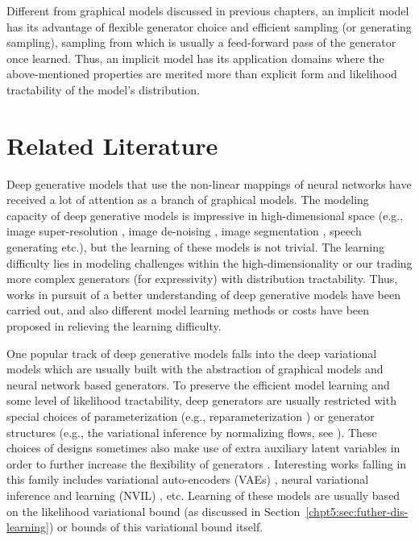 Different from graphical models discussed in previous chapters, an implicit model has its advantage of flexible generator choice and efficient sampling (or generating sampling), sampling from which is usually a feed-forward pass of the generator once learned. Thus, an implicit model has its application domains where the above-mentioned properties are merited more than explicit form and likelihood tractability of the model's distribution. 


\section{Related Literature}\label{chpt8:sec:literature}

Deep generative models that use the non-linear mappings of neural networks have received a lot of attention as a branch of graphical models. The modeling capacity of deep generative models is impressive in high-dimensional space (e.g., image super-resolution \cite{ledig2017photo}, image de-noising \cite{CreswellB2017denoise, dilokthanakulmg2016gausian-vae}, image segmentation \cite{marvin2018crf}, speech generating \cite{ryan2018waveglow} etc.), but the learning of these models is not trivial. The learning difficulty lies in modeling challenges within the high-dimensionality or our trading more complex generators (for expressivity) with distribution tractability. Thus, works in pursuit of a better understanding of deep generative models have been carried out, and also different model learning methods or costs have been proposed in relieving the learning difficulty.

One popular track of deep generative models falls into the deep variational models which are usually built with the abstraction of graphical models and neural network based generators. To preserve the efficient model learning and some level of likelihood tractability, deep generators are usually restricted with special choices of parameterization (e.g., reparameterization \cite{DBLP:journals/corr/KingmaW13}) or generator structures (e.g., the variational inference by normalizing flows, see \cite{rezende2015variational, kingma2016IVF, TomczakW16vae-flow}). These choices of designs sometimes also make use of extra auxiliary latent variables in order to further increase the flexibility of generators \cite{ranganath2015hierarchical}.  Interesting works falling in this family includes variational auto-encoders (VAEs) \cite{kingma2019vae}, neural variational inference and learning (NVIL) \cite{kuleshov2017neural_variational, mnih14NVIL, Li2020To}, etc. Learning of these models are usually based on the likelihood variational bound (as discussed in Section~\ref{chpt5:sec:futher-dis-learning}) or bounds of this variational bound itself.

